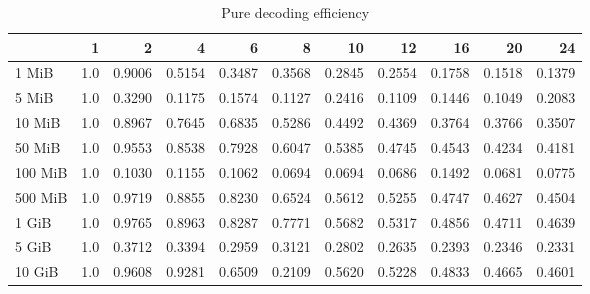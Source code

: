 \begin{table}[!h]
	\caption{Pure decoding efficiency}
\begin{tabular}{lrrrrrrrrrr}
	\toprule
		\diagbox{File sizes }{Threads} &   1  &      2  &      4  &      6  &      8  &      10 &      12 &      16 &      20 &      24 \\
	\midrule
	1 MiB   &  1.0 &  0.9006 &  0.5154 &  0.3487 &  0.3568 &  0.2845 &  0.2554 &  0.1758 &  0.1518 &  0.1379 \\
	5 MiB   &  1.0 &  0.3290 &  0.1175 &  0.1574 &  0.1127 &  0.2416 &  0.1109 &  0.1446 &  0.1049 &  0.2083 \\
	10 MiB  &  1.0 &  0.8967 &  0.7645 &  0.6835 &  0.5286 &  0.4492 &  0.4369 &  0.3764 &  0.3766 &  0.3507 \\
	50 MiB  &  1.0 &  0.9553 &  0.8538 &  0.7928 &  0.6047 &  0.5385 &  0.4745 &  0.4543 &  0.4234 &  0.4181 \\
	100 MiB &  1.0 &  0.1030 &  0.1155 &  0.1062 &  0.0694 &  0.0694 &  0.0686 &  0.1492 &  0.0681 &  0.0775 \\
	500 MiB &  1.0 &  0.9719 &  0.8855 &  0.8230 &  0.6524 &  0.5612 &  0.5255 &  0.4747 &  0.4627 &  0.4504 \\
	1 GiB   &  1.0 &  0.9765 &  0.8963 &  0.8287 &  0.7771 &  0.5682 &  0.5317 &  0.4856 &  0.4711 &  0.4639 \\
	5 GiB   &  1.0 &  0.3712 &  0.3394 &  0.2959 &  0.3121 &  0.2802 &  0.2635 &  0.2393 &  0.2346 &  0.2331 \\
	10 GiB  &  1.0 &  0.9608 &  0.9281 &  0.6509 &  0.2109 &  0.5620 &  0.5228 &  0.4833 &  0.4665 &  0.4601 \\
	\bottomrule
\end{tabular}
\end{table}